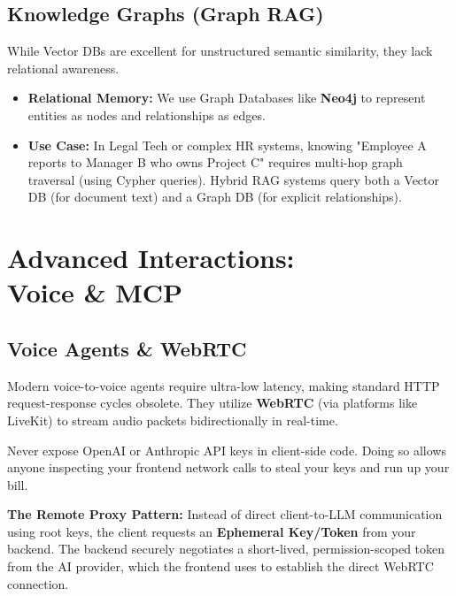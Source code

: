 \documentclass[12pt,a4paper,oneside]{book}
\begin{document}
\section{Knowledge Graphs (Graph RAG)}
While Vector DBs are excellent for unstructured semantic similarity, they lack relational awareness.
\begin{itemize}
    \item \textbf{Relational Memory:} We use Graph Databases like \textbf{Neo4j} to represent entities as nodes and relationships as edges.
    \item \textbf{Use Case:} In Legal Tech or complex HR systems, knowing "Employee A reports to Manager B who owns Project C" requires multi-hop graph traversal (using Cypher queries). Hybrid RAG systems query both a Vector DB (for document text) and a Graph DB (for explicit relationships).
\end{itemize}

\chapter[Advanced Interactions: Voice \& MCP]{Advanced Interactions:\\Voice \& MCP}

\section{Voice Agents \& WebRTC}
Modern voice-to-voice agents require ultra-low latency, making standard HTTP request-response cycles obsolete. They utilize \textbf{WebRTC} (via platforms like LiveKit) to stream audio packets bidirectionally in real-time.

\begin{warningbox}
Never expose OpenAI or Anthropic API keys in client-side code. Doing so allows anyone inspecting your frontend network calls to steal your keys and run up your bill.
\end{warningbox}
\textbf{The Remote Proxy Pattern:} Instead of direct client-to-LLM communication using root keys, the client requests an \textbf{Ephemeral Key/Token} from your backend. The backend securely negotiates a short-lived, permission-scoped token from the AI provider, which the frontend uses to establish the direct WebRTC connection.
\end{document}
